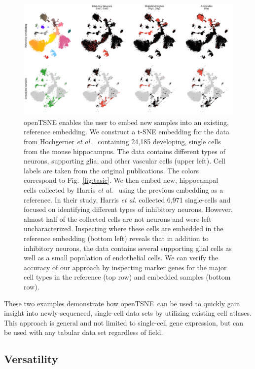 \documentclass[twocolumn]{bmcart}
\newcommand{\opentsne}{\textsf{openTSNE}}
\begin{document}
\begin{figure}[htbp]
  \includegraphics[width=\textwidth]{transform_hochgerner}
  \caption{\label{fig:transform}openTSNE enables the user to embed new samples
	into an existing, reference embedding. We construct a t-SNE embedding
	for the data from Hochgerner \textit{et
	al.}~\cite{hochgerner2018conserved} containing 24,185 developing,
	single cells from the mouse hippocampus. The data contains different
	types of neurons, supporting glia, and other vascular cells (upper
	left). Cell labels are taken from the original publications. The
	colors correspond to Fig.~\ref{fig:tasic}. We then embed new,
	hippocampal cells collected by Harris \textit{et
	al.}~\cite{harris2018classes} using the previous embedding as a
	reference. In their study, Harris \textit{et al.} collected 6,971
	single-cells and focused on identifying different types of inhibitory
	neurons. However, almost half of the collected cells are not neurons
	and were left uncharacterized. Inspecting where these cells are
	embedded in the reference embedding (bottom left) reveals that in
	addition to inhibitory neurons, the data contains several supporting
	glial cells as well as a small population of endothelial cells. We can
	verify the accuracy of our approach by inspecting marker genes for the
	major cell types in the reference (top row) and embedded samples
	(bottom row).}
\end{figure}

These two examples demonstrate how \opentsne\ can be used to quickly gain
insight into newly-sequenced, single-cell data sets by utilizing existing cell
atlases. This approach is general and not limited to single-cell gene
expression, but can be used with any tabular data set regardless of field.

\subsection*{Versatility}
\end{document}
